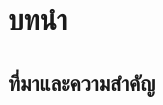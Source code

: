 \documentclass[12pt,oneside,openright,a4paper]{cpe-thai-project}
\begin{document}





\chapter{บทนำ}






\section{ที่มาและความสำคัญ}
\end{document}
